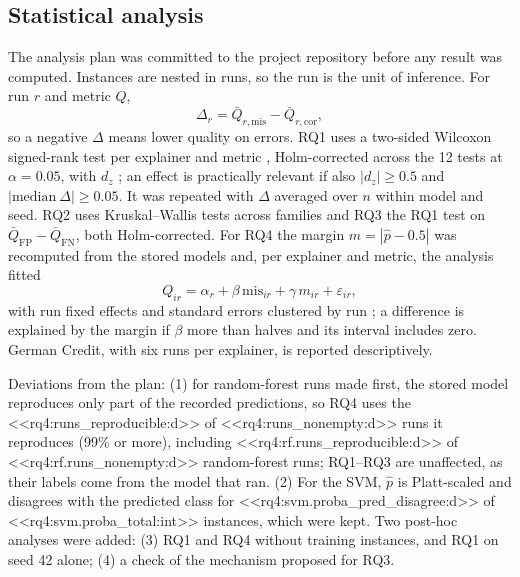 \documentclass[12pt,letterpaper]{article}
\begin{document}
\subsection{Statistical analysis}

The analysis plan was committed to the project repository before any result was
computed. Instances are nested in runs, so the run is the unit of inference. For run $r$
and metric $Q$,
\begin{equation}
\Delta_r = \bar{Q}_{r,\mathrm{mis}} - \bar{Q}_{r,\mathrm{cor}},
\end{equation}
so a negative $\Delta$ means lower quality on errors. RQ1 uses a two-sided Wilcoxon
signed-rank test per explainer and metric \cite{wilcoxon1945individual}, Holm-corrected
across the 12 tests \cite{holm1979simple} at $\alpha = 0.05$, with $d_z$
\cite{lakens2013calculating}; an effect is practically relevant if also
$|d_z| \geq 0.5$ and $|\text{median}\ \Delta| \geq 0.05$. It was repeated with $\Delta$
averaged over $n$ within model and seed. RQ2 uses Kruskal--Wallis tests across families
\cite{kruskal1952use} and RQ3 the RQ1 test on $\bar{Q}_{\mathrm{FP}} - \bar{Q}_{\mathrm{FN}}$,
both Holm-corrected. For RQ4 the margin $m = |\hat{p} - 0.5|$ was recomputed from the
stored models and, per explainer and metric, the analysis fitted
\begin{equation}
Q_{ir} = \alpha_r + \beta\, \mathrm{mis}_{ir} + \gamma\, m_{ir} + \varepsilon_{ir},
\end{equation}
with run fixed effects and standard errors clustered by run
\cite{cameron2015practitioner}; a difference is explained by the margin if $\beta$ more
than halves and its interval includes zero. German Credit, with six runs per explainer, is
reported descriptively.

Deviations from the plan: (1) for random-forest runs made first, the stored model
reproduces only part of the recorded predictions, so RQ4 uses the
<<rq4:runs_reproducible:d>> of <<rq4:runs_nonempty:d>> runs it reproduces (99\% or more),
including <<rq4:rf.runs_reproducible:d>> of <<rq4:rf.runs_nonempty:d>> random-forest runs;
RQ1--RQ3 are unaffected, as their labels come from the model that ran. (2) For the SVM,
$\hat{p}$ is Platt-scaled \cite{platt1999probabilistic} and disagrees with the predicted
class for <<rq4:svm.proba_pred_disagree:d>> of <<rq4:svm.proba_total:int>> instances,
which were kept. Two post-hoc analyses were added: (3) RQ1 and RQ4 without training
instances, and RQ1 on seed 42 alone; (4) a check of the mechanism proposed for RQ3.
\end{document}
